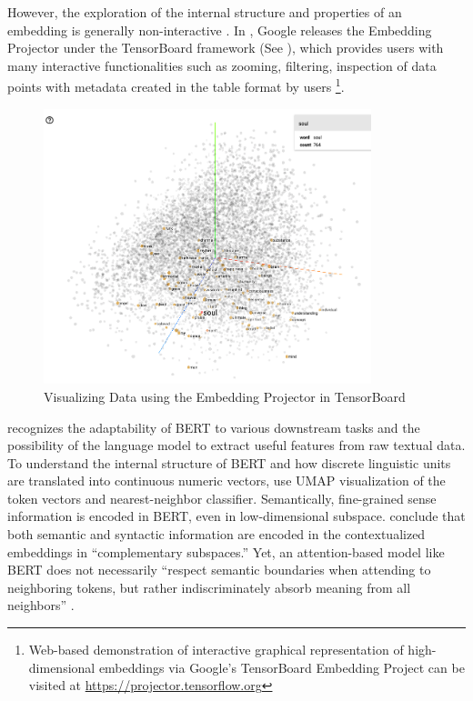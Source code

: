 However, the exploration of the internal structure and properties of an embedding is generally non-interactive \parencite{smilkov2016projector}. In \citeyear{smilkov2016projector}, Google releases the Embedding Projector under the TensorBoard framework (See ), which provides users with many interactive functionalities such as zooming, filtering, inspection of data points with metadata created in the table format by users \parencite{smilkov2016projector}\footnote{Web-based demonstration of interactive graphical representation of high-dimensional embeddings via Google's TensorBoard Embedding Project can be visited at \url{https://projector.tensorflow.org}}.

\begin{figure}[H]
  \centering
  \includegraphics[width=0.85\textwidth,keepaspectratio]{figures_ref/embedding_projector_demo}
  \caption{Visualizing Data using the Embedding Projector in TensorBoard} \label{fig:tensorboard_demo}
\end{figure}

\textcite{coenen2019visualizing} recognizes the adaptability of BERT to various downstream tasks and the possibility of the language model to extract useful features from raw textual data. To understand the internal structure of BERT and how discrete linguistic units are translated into continuous numeric vectors, \textcite{coenen2019visualizing} use UMAP visualization of the token vectors and nearest-neighbor classifier. Semantically, fine-grained sense information is encoded in BERT, even in low-dimensional subspace. \textcite{coenen2019visualizing} conclude that both semantic and syntactic information are encoded in the contextualized embeddings in ``complementary subspaces.'' Yet, an attention-based model like BERT does not necessarily ``respect semantic boundaries when attending to neighboring tokens, but rather indiscriminately absorb meaning from all neighbors'' \parencite{coenen2019visualizing}.

